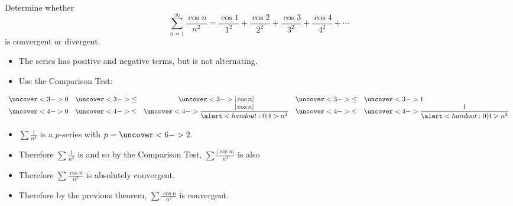 \begin{frame}
\begin{example}[Example 3, p. 751]
Determine whether
\abovedisplayskip=0pt
\belowdisplayskip=0pt
\[
\sum_{n=1}^\infty \frac{\cos n}{n^2} = \frac{\cos 1}{1^2} + \frac{\cos 2}{2^2} + \frac{\cos 3}{3^2} + \frac{\cos 4}{4^2} + \cdots%
\]
is convergent or divergent.
\begin{itemize}
\item<2->  The series has positive and negative terms, but is not alternating.
\item<3->  Use the Comparison Test:
\end{itemize}
\abovedisplayskip=0pt
\belowdisplayskip=0pt
\[
\displaystyle \begin{array}{rcccl}
\uncover<3->{%
0%
}%
& \uncover<3->{ \leq } & %
\uncover<3->{%
| \cos n |%
}%
& \uncover<3->{ \leq } & %
\uncover<3->{%
1%
}\\%
\uncover<4->{%
0%
}%
& \uncover<4->{ \leq } & %
\uncover<4->{%
\displaystyle \frac{| \cos n |}{\alert<handout:0| 4>{n^2}}%
}%
& \uncover<4->{ \leq } & %
\uncover<4->{%
\displaystyle \frac{1}{\alert<handout:0| 4>{n^2}}%
}%
\end{array}
\]
\vspace{-.5cm}
\begin{itemize}
\item<5->  $\sum \frac{1}{n^2}$ is a $p$-series with \alert<handout:0| 5-6>{$p = \uncover<6->{2.}$}
\item<7->  Therefore $\sum \frac{1}{n^2}$ is  and so by the Comparison Test, $\sum \frac{|\cos n|}{n^2}$ is also 
\item<9->  Therefore $\sum \frac{\cos n}{n^2}$ is absolutely convergent.
\item<10->  Therefore by the previous theorem, $\sum \frac{\cos n}{n^2}$ is convergent.
\end{itemize}
\end{example}
\end{frame}
